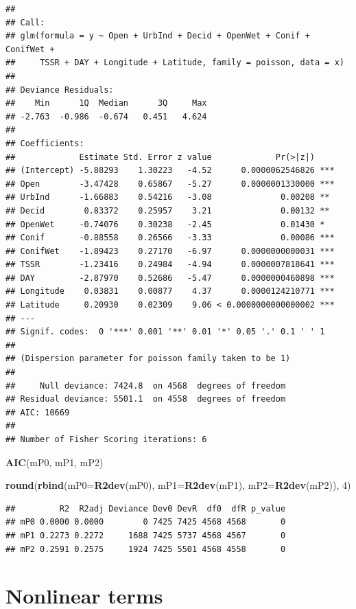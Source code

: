 \documentclass[12pt,]{book}
\newenvironment{Shaded}{\begin{snugshade}}{\end{snugshade}}
\newcommand{\DataTypeTok}[1]{\textcolor[rgb]{0.13,0.29,0.53}{#1}}
\newcommand{\DecValTok}[1]{\textcolor[rgb]{0.00,0.00,0.81}{#1}}
\newcommand{\KeywordTok}[1]{\textcolor[rgb]{0.13,0.29,0.53}{\textbf{#1}}}
\newcommand{\NormalTok}[1]{#1}
\begin{document}
\begin{verbatim}
## 
## Call:
## glm(formula = y ~ Open + UrbInd + Decid + OpenWet + Conif + ConifWet + 
##     TSSR + DAY + Longitude + Latitude, family = poisson, data = x)
## 
## Deviance Residuals: 
##    Min      1Q  Median      3Q     Max  
## -2.763  -0.986  -0.674   0.451   4.624  
## 
## Coefficients:
##             Estimate Std. Error z value             Pr(>|z|)    
## (Intercept) -5.88293    1.30223   -4.52      0.0000062546826 ***
## Open        -3.47428    0.65867   -5.27      0.0000001330000 ***
## UrbInd      -1.66883    0.54216   -3.08              0.00208 ** 
## Decid        0.83372    0.25957    3.21              0.00132 ** 
## OpenWet     -0.74076    0.30238   -2.45              0.01430 *  
## Conif       -0.88558    0.26566   -3.33              0.00086 ***
## ConifWet    -1.89423    0.27170   -6.97      0.0000000000031 ***
## TSSR        -1.23416    0.24984   -4.94      0.0000007818641 ***
## DAY         -2.87970    0.52686   -5.47      0.0000000460898 ***
## Longitude    0.03831    0.00877    4.37      0.0000124210771 ***
## Latitude     0.20930    0.02309    9.06 < 0.0000000000000002 ***
## ---
## Signif. codes:  0 '***' 0.001 '**' 0.01 '*' 0.05 '.' 0.1 ' ' 1
## 
## (Dispersion parameter for poisson family taken to be 1)
## 
##     Null deviance: 7424.8  on 4568  degrees of freedom
## Residual deviance: 5501.1  on 4558  degrees of freedom
## AIC: 10669
## 
## Number of Fisher Scoring iterations: 6
\end{verbatim}

\begin{Shaded}
\begin{Highlighting}[]
\KeywordTok{AIC}\NormalTok{(mP0, mP1, mP2)}

\KeywordTok{round}\NormalTok{(}\KeywordTok{rbind}\NormalTok{(}\DataTypeTok{mP0=}\KeywordTok{R2dev}\NormalTok{(mP0), }\DataTypeTok{mP1=}\KeywordTok{R2dev}\NormalTok{(mP1), }\DataTypeTok{mP2=}\KeywordTok{R2dev}\NormalTok{(mP2)), }\DecValTok{4}\NormalTok{)}
\end{Highlighting}
\end{Shaded}

\begin{verbatim}
##         R2  R2adj Deviance Dev0 DevR  df0  dfR p_value
## mP0 0.0000 0.0000        0 7425 7425 4568 4568       0
## mP1 0.2273 0.2272     1688 7425 5737 4568 4567       0
## mP2 0.2591 0.2575     1924 7425 5501 4568 4558       0
\end{verbatim}

\hypertarget{nonlinear-terms}{%
\section{Nonlinear terms}\label{nonlinear-terms}}
\end{document}
